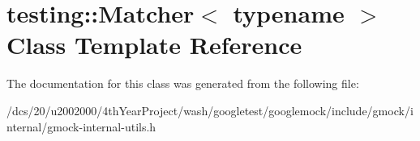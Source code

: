 \hypertarget{classtesting_1_1Matcher}{}\section{testing\+:\+:Matcher$<$ typename $>$ Class Template Reference}
\label{classtesting_1_1Matcher}


The documentation for this class was generated from the following file\+:\begin{DoxyCompactItemize}
\item 
/dcs/20/u2002000/4th\+Year\+Project/wash/googletest/googlemock/include/gmock/internal/gmock-\/internal-\/utils.\+h\end{DoxyCompactItemize}
